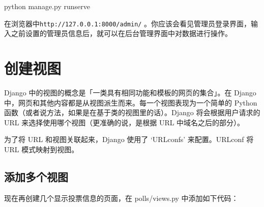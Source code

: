 \documentclass[]{ctexbook}
\newenvironment{Shaded}{\begin{snugshade}}{\end{snugshade}}
\newcommand{\ControlFlowTok}[1]{\textcolor[rgb]{0.13,0.29,0.53}{\textbf{#1}}}
\newcommand{\ExtensionTok}[1]{#1}
\newcommand{\ImportTok}[1]{#1}
\newcommand{\KeywordTok}[1]{\textcolor[rgb]{0.13,0.29,0.53}{\textbf{#1}}}
\newcommand{\NormalTok}[1]{#1}
\newcommand{\OperatorTok}[1]{\textcolor[rgb]{0.81,0.36,0.00}{\textbf{#1}}}
\newcommand{\SpecialCharTok}[1]{\textcolor[rgb]{0.00,0.00,0.00}{#1}}
\newcommand{\StringTok}[1]{\textcolor[rgb]{0.31,0.60,0.02}{#1}}
\begin{document}
\begin{Shaded}
\begin{Highlighting}[]
\ExtensionTok{python}\NormalTok{ manage.py runserve}
\end{Highlighting}
\end{Shaded}

在浏览器中\texttt{http://127.0.0.1:8000/admin/} 。你应该会看见管理员登录界面，输入之前设置的管理员信息后，就可以在后台管理界面中对数据进行操作。

\hypertarget{ux521bux5efaux89c6ux56fe-1}{%
\section{创建视图}\label{ux521bux5efaux89c6ux56fe-1}}

Django 中的视图的概念是「一类具有相同功能和模板的网页的集合」。在 Django 中，网页和其他内容都是从视图派生而来。每一个视图表现为一个简单的 Python 函数（或者说方法，如果是在基于类的视图里的话）。Django 将会根据用户请求的 URL 来选择使用哪个视图（更准确的说，是根据 URL 中域名之后的部分）。

为了将 URL 和视图关联起来，Django 使用了 `URLconfs' 来配置。URLconf 将 URL 模式映射到视图。

\hypertarget{ux6dfbux52a0ux591aux4e2aux89c6ux56fe}{%
\subsection{添加多个视图}\label{ux6dfbux52a0ux591aux4e2aux89c6ux56fe}}

现在再创建几个显示投票信息的页面，在 polls/views.py 中添加如下代码：

\begin{Shaded}
\end{Shaded}
\end{document}
